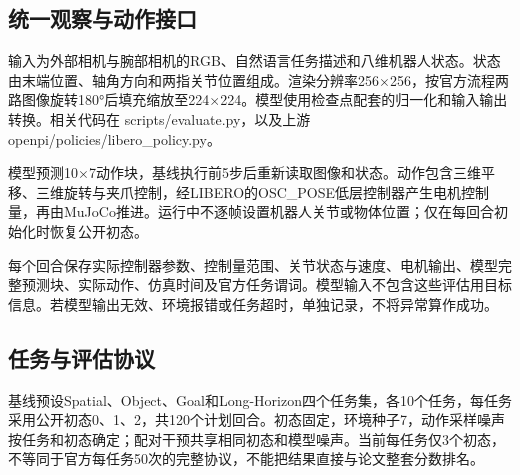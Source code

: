 \subsection{统一观察与动作接口}\label{s08-detail-2}

输入为外部相机与腕部相机的RGB、自然语言任务描述和八维机器人状态。状态由末端位置、轴角方向和两指关节位置组成。渲染分辨率256\(\times\)256，按官方流程两路图像旋转180°后填充缩放至224\(\times\)224。模型使用检查点配套的归一化和输入输出转换。相关代码在 scripts/evaluate.py，以及上游 openpi/policies/libero\_policy.py。

模型预测10\(\times\)7动作块，基线执行前5步后重新读取图像和状态。动作包含三维平移、三维旋转与夹爪控制，经LIBERO的OSC\_POSE低层控制器产生电机控制量，再由MuJoCo推进。运行中不逐帧设置机器人关节或物体位置；仅在每回合初始化时恢复公开初态。

每个回合保存实际控制器参数、控制量范围、关节状态与速度、电机输出、模型完整预测块、实际动作、仿真时间及官方任务谓词。模型输入不包含这些评估用目标信息。若模型输出无效、环境报错或任务超时，单独记录，不将异常算作成功。


\subsection{任务与评估协议}\label{s08-detail-3}

基线预设Spatial、Object、Goal和Long-Horizon四个任务集，各10个任务，每任务采用公开初态0、1、2，共120个计划回合。初态固定，环境种子7，动作采样噪声按任务和初态确定；配对干预共享相同初态和模型噪声。当前每任务仅3个初态，不等同于官方每任务50次的完整协议，不能把结果直接与论文整套分数排名。

